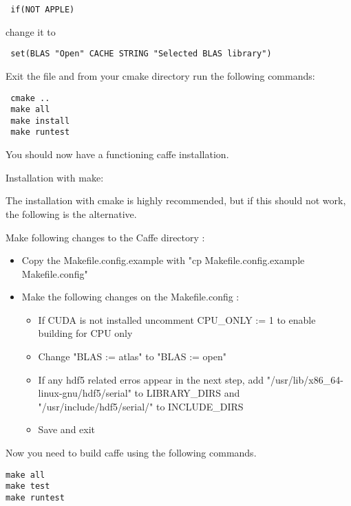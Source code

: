 \documentclass[main.tex]{subfiles}
\begin{document}
 \begin{lstlisting}
 if(NOT APPLE)
 \end{lstlisting}
 
 change it to 
 
 \begin{lstlisting}
 set(BLAS "Open" CACHE STRING "Selected BLAS library")
 \end{lstlisting}
 
 Exit the file and from your cmake directory run the following commands:
 \begin{lstlisting}
 cmake ..
 make all
 make install
 make runtest
 \end{lstlisting}
 You should now have a functioning caffe installation.

\newpage
 
 
 
 
Installation with make:

The installation with cmake is highly recommended, but if this should not work, the following is the alternative.

 Make following changes to the Caffe directory : 
 \begin{itemize}
 \item Copy the Makefile.config.example with "cp Makefile.config.example Makefile.config"
 \item Make the following changes on the Makefile.config :
 	\begin{itemize}
 	\item If CUDA is not installed uncomment CPU\_ONLY := 1 to enable building for CPU only
 	\item Change "BLAS := atlas" to "BLAS := open"
 	\item If any hdf5 related erros appear in the next step, add "/usr/lib/x86\_64-linux-gnu/hdf5/serial" to LIBRARY\_DIRS and "/usr/include/hdf5/serial/" to INCLUDE\_DIRS
 	\item Save and exit
 	\end{itemize}
 	
 \end{itemize}
Now you need to build caffe using the following commands.
\begin{lstlisting}
make all
make test
make runtest  
\end{lstlisting}

 
\end{document}
